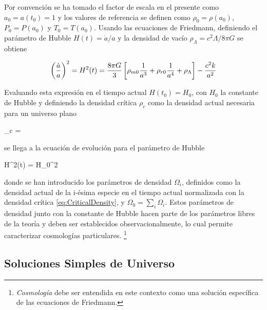 Por convención se ha tomado el factor de escala en el presente como
$a_0 = a(t_0) = 1$ y los valores de referencia se definen como
$\rho_0 = \rho(a_0)$, $P_0 = P(a_0)$ y $T_0 = T(a_0)$. Usando las 
ecuaciones de Friedmann, definiendo el parámetro de Hubble 
$H(t) = \dot a/ a$ y la densidad de vacío 
$\rho_\Lambda = c^2\Lambda/8\pi G$ se obtiene


\[ \left(  \frac{\dot a}{a}  \right)^2 = H^2(t) = \frac{ 8\pi G}{3}
\left[  \rho_{m0}\frac{1}{a^{3}} + \rho_{r0}\frac{1}{a^{4}} + \rho_{\Lambda}  \right]
- \frac{ c^2 k }{a^2} \]


Evaluando esta expresión en el tiempo actual $H(t_0) = H_0$, con $H_0$ la 
constante de Hubble y definiendo la densidad crítica $\rho_c$ como la 
densidad actual necesaria para un universo plano


{ \rho_c =  }


se llega a la ecuación de evolución para el parámetro de Hubble


{ H^2(t) = H_0^2  }


donde se han introducido los parámetros de densidad $\Omega_i$, definidos 
como la densidad actual de la i-ésima especie en el tiempo actual 
normalizada con la densidad crítica \ref{eq:CriticalDensity}, y 
$\Omega_0 = \sum_i \Omega_i$. Estos parámetros de densidad junto con la 
constante de Hubble hacen parte de los parámetros libres de la teoría y 
deben ser establecidos observacionalmente, lo cual permite caracterizar 
cosmologías particulares. \footnote{\textit{Cosmología} debe ser 
entendida en este contexto como una solución específica de las ecuaciones 
de Friedmann.}


	\subsection{Soluciones Simples de Universo}
	\label{subsec:SimpleSolutionsOfTheUniverse}


